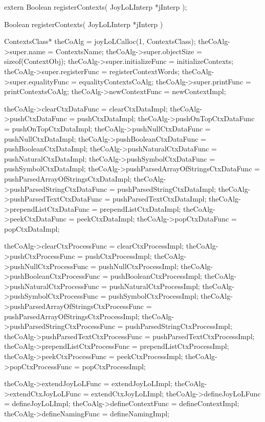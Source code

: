 \startCHeader
extern Boolean registerContexts(
  JoyLoLInterp *jInterp
);
\stopCHeader
{}

\startCCode
Boolean registerContexts(
  JoyLoLInterp *jInterp
) {
  ContextsClass* theCoAlg    = 
    joyLoLCalloc(1, ContextsClass);
  theCoAlg->super.name             = ContextsName;
  theCoAlg->super.objectSize       = sizeof(ContextObj);
  theCoAlg->super.initializeFunc   = initializeContexts;
  theCoAlg->super.registerFunc     = registerContextWords;
  theCoAlg->super.equalityFunc     = equalityContextsCoAlg;
  theCoAlg->super.printFunc        = printContextsCoAlg;
  theCoAlg->newContextFunc         = newContextImpl;
  
  theCoAlg->clearCtxDataFunc       = clearCtxDataImpl;
  theCoAlg->pushCtxDataFunc        = pushCtxDataImpl;
  theCoAlg->pushOnTopCtxDataFunc   = pushOnTopCtxDataImpl;
  theCoAlg->pushNullCtxDataFunc    = pushNullCtxDataImpl;
  theCoAlg->pushBooleanCtxDataFunc = pushBooleanCtxDataImpl;
  theCoAlg->pushNaturalCtxDataFunc = pushNaturalCtxDataImpl;
  theCoAlg->pushSymbolCtxDataFunc  = pushSymbolCtxDataImpl;
  theCoAlg->pushParsedArrayOfStringsCtxDataFunc =
    pushParsedArrayOfStringsCtxDataImpl;
  theCoAlg->pushParsedStringCtxDataFunc =
    pushParsedStringCtxDataImpl;
  theCoAlg->pushParsedTextCtxDataFunc =
    pushParsedTextCtxDataImpl;
  theCoAlg->prependListCtxDataFunc = prependListCtxDataImpl;
  theCoAlg->peekCtxDataFunc        = peekCtxDataImpl;
  theCoAlg->popCtxDataFunc         = popCtxDataImpl;
  
  theCoAlg->clearCtxProcessFunc    = clearCtxProcessImpl;
  theCoAlg->pushCtxProcessFunc     = pushCtxProcessImpl;
  theCoAlg->pushNullCtxProcessFunc = pushNullCtxProcessImpl;
  theCoAlg->pushBooleanCtxProcessFunc =
    pushBooleanCtxProcessImpl;
  theCoAlg->pushNaturalCtxProcessFunc =
    pushNaturalCtxProcessImpl;
  theCoAlg->pushSymbolCtxProcessFunc =
    pushSymbolCtxProcessImpl;
  theCoAlg->pushParsedArrayOfStringsCtxProcessFunc =
    pushParsedArrayOfStringsCtxProcessImpl;
  theCoAlg->pushParsedStringCtxProcessFunc =
    pushParsedStringCtxProcessImpl;
  theCoAlg->pushParsedTextCtxProcessFunc =
    pushParsedTextCtxProcessImpl;
  theCoAlg->prependListCtxProcessFunc =
    prependListCtxProcessImpl;
  theCoAlg->peekCtxProcessFunc      = peekCtxProcessImpl;
  theCoAlg->popCtxProcessFunc      = popCtxProcessImpl;
  
  theCoAlg->extendJoyLoLFunc       = extendJoyLoLImpl;
  theCoAlg->extendCtxJoyLoLFunc    = extendCtxJoyLoLImpl;
  theCoAlg->defineJoyLoLFunc       = defineJoyLoLImpl;
  theCoAlg->defineContextFunc      = defineContextImpl;
  theCoAlg->defineNamingFunc       = defineNamingImpl;

}

